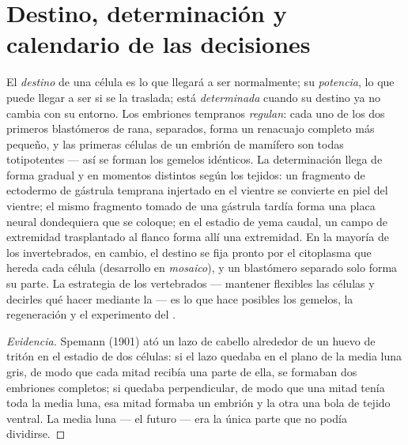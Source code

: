 \section{Destino, determinación y calendario de las decisiones}

\begin{proposition}\label{prop:b2:vertebrate-development:commitment}
El \emph{destino} de una célula es lo que llegará a ser normalmente; su
\emph{potencia}, lo que puede llegar a ser si se la traslada; está
\emph{determinada} cuando su destino ya no cambia con su entorno. Los
embriones tempranos \emph{regulan}: cada uno de los dos primeros
blastómeros de rana, separados, forma un renacuajo completo más pequeño,
y las primeras células de un embrión de mamífero son todas totipotentes
--- así se forman los gemelos idénticos. La determinación llega de forma
gradual y en momentos distintos según los tejidos: un fragmento de
ectodermo de gástrula temprana injertado en el vientre se convierte en
piel del vientre; el mismo fragmento tomado de una gástrula tardía forma
una placa neural dondequiera que se coloque; en el estadio de yema
caudal, un campo de extremidad trasplantado al flanco forma allí una
extremidad. En la mayoría de los invertebrados, en cambio, el destino se
fija pronto por el citoplasma que hereda cada célula (desarrollo en
\emph{mosaico}), y un blastómero separado solo forma su parte. La
estrategia de los vertebrados --- mantener flexibles las células y
decirles qué hacer mediante la  --- es lo que hace posibles los
gemelos, la regeneración y el experimento del .
\end{proposition}
\begin{proof}[Evidencia]
Spemann (1901) ató un lazo de cabello alrededor de un huevo de tritón en
el estadio de dos células: si el lazo quedaba en el plano de la media luna
gris, de modo que cada mitad recibía una parte de ella, se formaban dos
embriones completos; si quedaba perpendicular, de modo que una mitad
tenía toda la media luna, esa mitad formaba un embrión y la otra una bola
de tejido ventral. La media luna --- el futuro  --- era la
única parte que no podía dividirse.
\end{proof}

